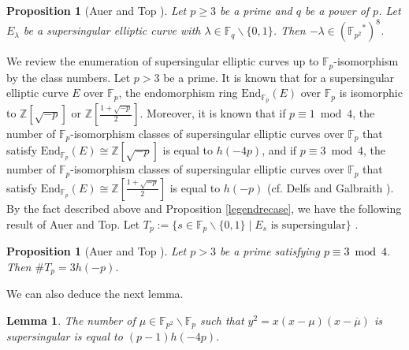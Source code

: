 \documentclass[a4paper, 11pt]{article}
\theoremstyle{plain}
\newtheorem{prop}[defn]{Proposition}
\newtheorem{lem}[defn]{Lemma}
\newcommand{\?}{\textcolor{red}{??}}
\newcommand{\lm}{\lambda}
\newcommand{\fp}{\mathbb{F}_p}
\newcommand{\fpp}{\mathbb{F}_{p^2}}
\newcommand{\fq}{\mathbb{F}_q}
\newcommand{\bZ}{\mathbb{Z}}
\begin{document}
\begin{prop}[Auer and Top {\cite[Proposition 3.2.]{AT02}}]
\label{propfpp8}
     Let $p \ge 3$ be a prime and $q$ be a power of $p$. Let $E_{\lm}$ be a supersingular elliptic curve with $\lm \in \fq \smallsetminus \{0,1 \}$. Then $-\lm \in \left( {{\mathbb{F}}_{p^2}}^{*}\right) ^8$.
\end{prop}

We review the enumeration of supersingular elliptic curves up to $\fp$-isomorphism by the class numbers. Let $p>3$ be a prime. It is known that for a supersingular elliptic curve $E$ over $\fp$, the endomorphism ring ${\textrm{End}}_{\fp}(E)$ over $\fp$ is isomorphic to $\bZ[\sqrt{-p}] $ or $\bZ \left[\frac{1+\sqrt{-p}}{2} \right]$. Moreover, it is known that if $p \equiv 1 \bmod 4$, the number of $\fp$-isomorphism classes of supersingular elliptic curves over $\fp$ that satisfy 
${\textrm{End}}_{\fp}(E) \cong \bZ[\sqrt{-p}] $ is equal to $h(-4p)$, and if $p \equiv 3 \bmod 4$, the number of $\fp$-isomorphism classes of supersingular elliptic curves over $\fp$ that satisfy ${\textrm{End}}_{\fp}(E) \cong \bZ \left[\frac{1+\sqrt{-p}}{2} \right]$ is equal to $ h(-p)$ (cf. Delfs and Galbraith \cite[Theorem 2.1, Theorem 2.7]{DG02}).
\\

By the fact described above and Proposition \ref{legendrecase}, we have the following result of Auer and Top.
Let $T_p:=\{ s \in \fp\smallsetminus\{0,1 \} \mid E_s\text{ is supersingular} \}$ .

\begin{prop}[Auer and Top {\cite[Proposition 3.2.]{AT02}}]
\label{numtp}
    Let $p>3$ be a prime satisfying \textcolor{black}{$ p \equiv 3 \bmod 4$}. Then $\# T_p=3h(-p)$.     
\end{prop}

We can also deduce the next lemma.

\begin{lem}\label{spsub}
The number of $\mu \in  \fpp \smallsetminus \fp$
such that $y^2=x(x-\mu)(x-\overline{\mu})$ is supersingular is equal to $(p-1)h(-4p)$.
\end{lem}
\end{document}
